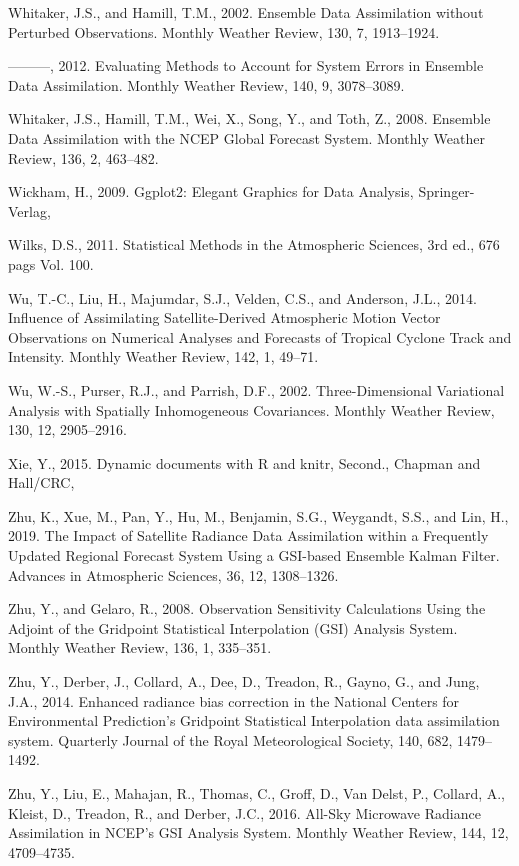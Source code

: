\documentclass[12pt,oneside]{reedthesis}
\begin{document}
\leavevmode\hypertarget{ref-whitaker2002}{}%
Whitaker, J.S., and Hamill, T.M., 2002. Ensemble Data Assimilation without Perturbed Observations. Monthly Weather Review, 130, 7, 1913--1924.

\leavevmode\hypertarget{ref-whitaker2012}{}%
---------, 2012. Evaluating Methods to Account for System Errors in Ensemble Data Assimilation. Monthly Weather Review, 140, 9, 3078--3089.

\leavevmode\hypertarget{ref-whitaker2008}{}%
Whitaker, J.S., Hamill, T.M., Wei, X., Song, Y., and Toth, Z., 2008. Ensemble Data Assimilation with the NCEP Global Forecast System. Monthly Weather Review, 136, 2, 463--482.

\leavevmode\hypertarget{ref-wickham2009}{}%
Wickham, H., 2009. Ggplot2: Elegant Graphics for Data Analysis, Springer-Verlag,

\leavevmode\hypertarget{ref-wilks2011}{}%
Wilks, D.S., 2011. Statistical Methods in the Atmospheric Sciences, 3rd ed., 676 pags Vol. 100.

\leavevmode\hypertarget{ref-wu2014}{}%
Wu, T.-C., Liu, H., Majumdar, S.J., Velden, C.S., and Anderson, J.L., 2014. Influence of Assimilating Satellite-Derived Atmospheric Motion Vector Observations on Numerical Analyses and Forecasts of Tropical Cyclone Track and Intensity. Monthly Weather Review, 142, 1, 49--71.

\leavevmode\hypertarget{ref-wu2002}{}%
Wu, W.-S., Purser, R.J., and Parrish, D.F., 2002. Three-Dimensional Variational Analysis with Spatially Inhomogeneous Covariances. Monthly Weather Review, 130, 12, 2905--2916.

\leavevmode\hypertarget{ref-xie2015}{}%
Xie, Y., 2015. Dynamic documents with R and knitr, Second., Chapman and Hall/CRC,

\leavevmode\hypertarget{ref-zhu2019}{}%
Zhu, K., Xue, M., Pan, Y., Hu, M., Benjamin, S.G., Weygandt, S.S., and Lin, H., 2019. The Impact of Satellite Radiance Data Assimilation within a Frequently Updated Regional Forecast System Using a GSI-based Ensemble Kalman Filter. Advances in Atmospheric Sciences, 36, 12, 1308--1326.

\leavevmode\hypertarget{ref-zhu2008}{}%
Zhu, Y., and Gelaro, R., 2008. Observation Sensitivity Calculations Using the Adjoint of the Gridpoint Statistical Interpolation (GSI) Analysis System. Monthly Weather Review, 136, 1, 335--351.

\leavevmode\hypertarget{ref-zhu2014}{}%
Zhu, Y., Derber, J., Collard, A., Dee, D., Treadon, R., Gayno, G., and Jung, J.A., 2014. Enhanced radiance bias correction in the National Centers for Environmental Prediction's Gridpoint Statistical Interpolation data assimilation system. Quarterly Journal of the Royal Meteorological Society, 140, 682, 1479--1492.

\leavevmode\hypertarget{ref-zhu2016}{}%
Zhu, Y., Liu, E., Mahajan, R., Thomas, C., Groff, D., Van Delst, P., Collard, A., Kleist, D., Treadon, R., and Derber, J.C., 2016. All-Sky Microwave Radiance Assimilation in NCEP's GSI Analysis System. Monthly Weather Review, 144, 12, 4709--4735.


\end{document}
